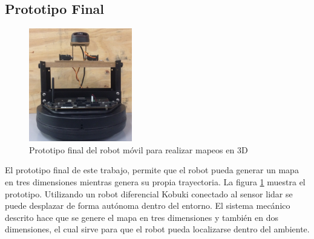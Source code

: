 \subsection{Prototipo Final}
\begin{figure}%
	\centering \footnotesize
	\includegraphics[width=0.40\textwidth]{images/kbkiReal3D.jpg}
	\captionsetup{font=footnotesize}
	\caption{Prototipo final del robot móvil para realizar mapeos en 3D}
	\label{fig:ProtoFinal}
\end{figure}
El prototipo final de este trabajo, permite que el robot pueda generar un mapa en tres dimensiones 
mientras genera su propia trayectoria. La figura \ref{fig:ProtoFinal} muestra el prototipo. Utilizando
un robot diferencial Kobuki conectado al sensor lidar se puede desplazar de forma autónoma
dentro del entorno. El sistema mecánico descrito hace que se genere el mapa en tres dimensiones
y también en dos dimensiones, el cual sirve para que el robot pueda localizarse dentro del ambiente.



